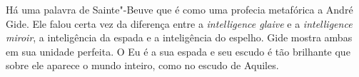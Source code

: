 Há uma palavra de Sainte"-Beuve que é como uma profecia metafórica a
André Gide. Ele falou certa vez da diferença entre a \emph{intelligence glaive} e a
\emph{intelligence miroir}, a inteligência da espada e a inteligência do espelho.
Gide mostra ambas em sua unidade perfeita. O Eu é a sua espada e seu
escudo é tão brilhante que sobre ele aparece o mundo inteiro, como no escudo de Aquiles.
